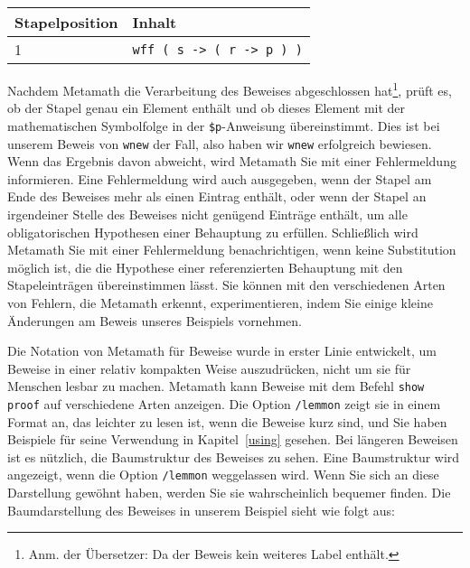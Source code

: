 \begin{center}\begin{tabular}{|l|l|}\hline
{Stapelposition} & {Inhalt} \\ \hline \hline
1 & \texttt{wff ( s -> ( r -> p ) )} \\ \hline
\end{tabular}\end{center}

Nachdem Metamath die Verarbeitung des Beweises abgeschlossen hat\footnote{Anm. der Übersetzer: Da der Beweis kein weiteres Label enthält.}, prüft es, ob der Stapel genau ein Element enthält und ob dieses Element mit der mathematischen Symbolfolge in der \texttt{\$p}-Anweisung übereinstimmt.  Dies ist bei unserem Beweis von \texttt{wnew} der Fall, also haben wir \texttt{wnew} erfolgreich bewiesen.  Wenn das Ergebnis davon abweicht, wird Metamath Sie mit einer Fehlermeldung informieren.  Eine Fehlermeldung wird auch ausgegeben, wenn der Stapel am Ende des Beweises mehr als einen Eintrag enthält, oder wenn der Stapel an irgendeiner Stelle des Beweises nicht genügend Einträge enthält, um alle obligatorischen Hypothesen einer Behauptung zu erfüllen.  Schließlich wird Metamath Sie mit einer Fehlermeldung benachrichtigen, wenn keine Substitution möglich ist, die die Hypothese einer referenzierten Behauptung mit den Stapeleinträgen übereinstimmen lässt.  Sie können mit den verschiedenen Arten von Fehlern, die Metamath erkennt, experimentieren, indem Sie einige kleine Änderungen am Beweis unseres Beispiels vornehmen.

Die Notation von Metamath für Beweise wurde in erster Linie entwickelt, um Beweise in einer relativ kompakten Weise auszudrücken, nicht um sie für Menschen lesbar zu machen.  Metamath kann Beweise mit dem Befehl \texttt{show proof} auf verschiedene Arten anzeigen.  Die Option \texttt{/lemmon} zeigt sie in einem Format an, das leichter zu lesen ist, wenn die Beweise kurz sind, und Sie haben Beispiele für seine Verwendung in Kapitel~\ref{using} gesehen.  Bei längeren Beweisen ist es nützlich, die Baumstruktur des Beweises zu sehen.  Eine Baumstruktur wird angezeigt, wenn die Option \texttt{/lemmon} weggelassen wird.  Wenn Sie sich an diese Darstellung gewöhnt haben, werden Sie sie wahrscheinlich bequemer finden. Die Baumdarstellung des Beweises in unserem Beispiel sieht wie folgt aus:\label{treeproof}

